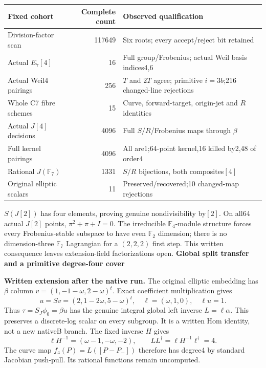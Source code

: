 \documentclass[10pt,a4paper]{article}
\begin{document}
\begin{center}
\begin{tabular}{lrp{79mm}}
\toprule
Fixed cohort & Complete count & Observed qualification\\
\midrule
Division-factor scan &117649& Six roots; every accept/reject bit retained\\
Actual $E_7[4]$ &16& Full group/Frobenius; actual Weil basis indices4,6\\
Actual Weil4 pairings &256& $T$ and $2T$ agree; primitive $i=3b$;216 changed-line rejections\\
Whole C7 fibre schemes &15& Curve, forward-target, origin-jet and $R$ identities\\
Actual $J[4]$ decisions &4096& Full $S/R$/Frobenius maps through $\beta$\\
Full kernel pairings &4096& All are1;64-point kernel,16 killed by2,48 of order4\\
Rational $J(\mathbb F_7)$ &1331& $S/R$ bijections, both composites$[4]$\\
Original elliptic scalars &11& Preserved/recovered;10 changed-map rejections\\
\bottomrule
\end{tabular}
\end{center}

$S(J[2])$ has four elements, proving genuine nondivisibility by$[2]$.
On all64 actual $J[2]$ points, $\pi^2+\pi+I=0$. The irreducible
$\mathbb F_4$-module structure forces every Frobenius-stable subspace
to have even $\mathbb F_2$ dimension; there is no dimension-three
$\mathbb F_7$ Lagrangian for a $(2,2,2)$ first step. This written
consequence leaves extension-field factorizations open.
\newpage
{\Large\bfseries Global split transfer and a primitive degree-four cover}\par
\textbf{Written extension after the native run.} The original elliptic
embedding has $\beta$ column $v=(1,-1-\omega,2-\omega)^t$. Exact
coefficient multiplication gives
\[
 u=Sv=(2,1-2\omega,5-\omega)^t,\quad
 \ell=(\omega,1,0),\quad \ell u=1.
\]
Thus $\tau=S_J\phi_0=\beta u$ has the genuine integral global left
inverse $L=\ell\alpha$. This preserves a discrete-log scalar on every
subgroup. It is a written Hom identity, not a new nativeB branch.
The fixed inverse $H$ gives
\[
 \ell H^{-1}=(\omega-1,-\omega,-2),\qquad
 LL^\dagger=\ell H^{-1}\ell^\dagger=4.
\]
The curve map $f_4(P)=L([P-P_-])$ therefore has degree4 by standard
Jacobian push-pull. Its rational functions remain uncomputed.
\end{document}
